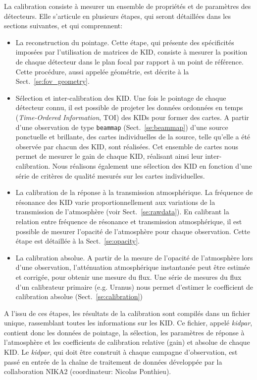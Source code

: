 La calibration consiste à mesurer un ensemble de propriétés et de
paramètres des détecteurs. Elle s'articule en plusieurs étapes, qui
seront détaillées dans les sections suivantes, et qui comprennent:
\begin{itemize}
  \item{La reconstruction du pointage. Cette étape, qui présente
    des spécificités imposées par l'utilisation de matrices de KID,
    consiste à mesurer la position de chaque détecteur dans le plan
    focal par rapport à un point de référence. Cette procédure, aussi
    appelée géométrie, est décrite à la Sect.~\ref{se:fov_geometry}.}
  \item{Sélection et inter-calibration des KID. Une fois le pointage
    de chaque détecteur connu, il est possible de projeter les données
    ordonnées en temps (\emph{Time-Ordered Information}, TOI)} des KIDs
    pour former des cartes. A partir d'une observation de type
    {\tt beammap} (Sect.~\ref{se:beammap}) d'une source ponctuelle
    et brillante, des cartes individuelles de la source, telle qu'elle
    a été observée par chacun des KID, sont réalisées. Cet ensemble
    de cartes nous permet de mesurer le gain de chaque KID, réalisant
    ainsi leur inter-calibration. Nous réalisons également une
    sélection des KID en fonction d'une série de critères de qualité
    mesurés sur les cartes individuelles.
  \item{La calibration de la réponse à la transmission
    atmosphérique. La fréquence de résonance des KID varie
    proportionnellement aux variations de la transmission de
    l'atmosphère (voir Sect.~\ref{se:rawdata}). En calibrant la
    relation entre
    fréquence de résonance et transmission atmosphérique, il est
    possible de mesurer l'opacité de l'atmosphère pour chaque
    observation. Cette étape est détaillée à la
    Sect.~\ref{se:opacity}.}
  \item{La calibration absolue. A partir de la mesure de l'opacité de
    l'atmosphère lors d'une observation, l'atténuation atmosphérique
    instantanée peut être estimée et corrigée, pour obtenir une mesure
    du flux. Une série de mesures du flux d'un calibrateur primaire
    (e.g. Uranus) nous permet d'estimer le coefficient de calibration
    absolue (Sect.~\ref{se:calibration})}
\end{itemize}

A l'issu de ces étapes, les résultats de la calibration sont compilés
dans un fichier unique, rassemblant toutes les informations sur les
KID. Ce fichier, appelé \emph{kidpar}, contient donc les données de
pointage, la sélection, les paramètres de réponse à l'atmosphère et
les coefficients de calibration relative (gain) et absolue de chaque
KID. Le \emph{kidpar}, qui doit être construit à chaque campagne
d'observation, est passé en entrée de la chaîne de traitement de
données développée par la collaboration NIKA2 (coordinateur: Nicolas
Ponthieu).

